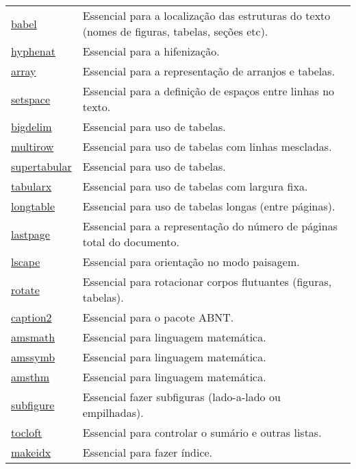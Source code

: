 \begin{longtable}{@{\extracolsep{\fill}}p{2cm} p{12cm}}
\href{https://www.ctan.org/pkg/babel}{babel} & Essencial para a localização das estruturas do texto (nomes de figuras, tabelas, seções etc). \\
\href{https://www.ctan.org/pkg/hyphenat}{hyphenat} & Essencial para a hifenização. \\
\href{https://www.ctan.org/pkg/array}{array} & Essencial para a representação de arranjos e tabelas. \\
\href{https://www.ctan.org/pkg/setspace}{setspace} & Essencial para a definição de espaços entre linhas no texto. \\
\href{https://www.ctan.org/pkg/bigdelim}{bigdelim} & Essencial para uso de tabelas. \\
\href{https://www.ctan.org/pkg/multirow}{multirow} & Essencial para uso de tabelas com linhas mescladas. \\
\href{https://www.ctan.org/pkg/supertabular}{supertabular} & Essencial para uso de tabelas. \\
\href{https://www.ctan.org/pkg/tabularx}{tabularx} & Essencial para uso de tabelas com largura fixa. \\
\href{https://www.ctan.org/pkg/longtable}{longtable} & Essencial para uso de tabelas longas (entre páginas). \\
\href{https://www.ctan.org/pkg/lastpage}{lastpage} & Essencial para a representação do número de páginas total do documento. \\
\href{https://www.ctan.org/pkg/lscape}{lscape} & Essencial para orientação no modo paisagem. \\
\href{https://www.ctan.org/pkg/rotate}{rotate} & Essencial para rotacionar corpos flutuantes (figuras, tabelas). \\
\href{https://www.ctan.org/pkg/caption2}{caption2} & Essencial para o pacote ABNT. \\
\href{https://www.ctan.org/pkg/amsmath}{amsmath} & Essencial para linguagem matemática. \\
\href{https://www.ctan.org/pkg/amsfonts}{amssymb} & Essencial para linguagem matemática. \\
\href{https://www.ctan.org/pkg/amsthm}{amsthm} & Essencial para linguagem matemática. \\
\href{https://www.ctan.org/pkg/subfigure}{subfigure} & Essencial fazer subfiguras (lado-a-lado ou empilhadas). \\
\href{https://www.ctan.org/pkg/tocloft}{tocloft} & Essencial para controlar o sumário e outras listas. \\
\href{https://www.ctan.org/pkg/makeidx}{makeidx} & Essencial para fazer índice. \\

\end{longtable}
